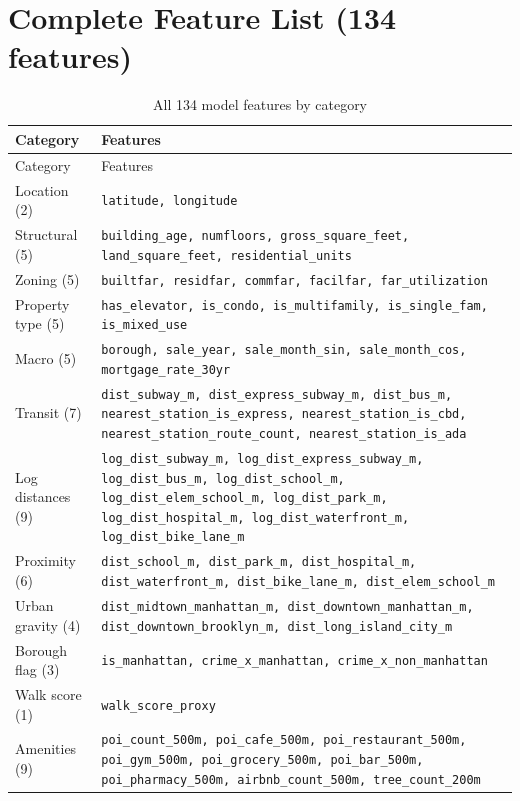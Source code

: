 \documentclass[11pt, a4paper, twoside]{report}
\begin{document}
\section{Complete Feature List (134 features)}
\begin{longtable}{lp{10cm}}
  \caption{All 134 model features by category} \label{tab:all_features}\\
  \toprule
  Category & Features \\
  \midrule
  \endfirsthead
  \midrule
  Category & Features \\
  \midrule
  \endhead
  \bottomrule
  \endfoot
  Location (2)        & \texttt{latitude, longitude} \\
  Structural (5)      & \texttt{building\_age, numfloors, gross\_square\_feet, land\_square\_feet, residential\_units} \\
  Zoning (5)          & \texttt{builtfar, residfar, commfar, facilfar, far\_utilization} \\
  Property type (5)   & \texttt{has\_elevator, is\_condo, is\_multifamily, is\_single\_fam, is\_mixed\_use} \\
  Macro (5)           & \texttt{borough, sale\_year, sale\_month\_sin, sale\_month\_cos, mortgage\_rate\_30yr} \\
  Transit (7)         & \texttt{dist\_subway\_m, dist\_express\_subway\_m, dist\_bus\_m, nearest\_station\_is\_express, nearest\_station\_is\_cbd, nearest\_station\_route\_count, nearest\_station\_is\_ada} \\
  Log distances (9)   & \texttt{log\_dist\_subway\_m, log\_dist\_express\_subway\_m, log\_dist\_bus\_m, log\_dist\_school\_m, log\_dist\_elem\_school\_m, log\_dist\_park\_m, log\_dist\_hospital\_m, log\_dist\_waterfront\_m, log\_dist\_bike\_lane\_m} \\
  Proximity (6)       & \texttt{dist\_school\_m, dist\_park\_m, dist\_hospital\_m, dist\_waterfront\_m, dist\_bike\_lane\_m, dist\_elem\_school\_m} \\
  Urban gravity (4)   & \texttt{dist\_midtown\_manhattan\_m, dist\_downtown\_manhattan\_m, dist\_downtown\_brooklyn\_m, dist\_long\_island\_city\_m} \\
  Borough flag (3)    & \texttt{is\_manhattan, crime\_x\_manhattan, crime\_x\_non\_manhattan} \\
  Walk score (1)      & \texttt{walk\_score\_proxy} \\
  Amenities (9)       & \texttt{poi\_count\_500m, poi\_cafe\_500m, poi\_restaurant\_500m, poi\_gym\_500m, poi\_grocery\_500m, poi\_bar\_500m, poi\_pharmacy\_500m, airbnb\_count\_500m, tree\_count\_200m} \\

\end{longtable}
\end{document}
